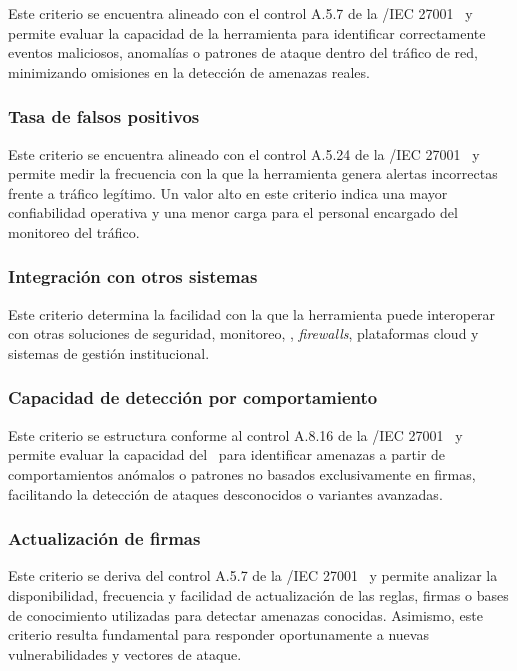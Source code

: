 Este criterio se encuentra alineado con el control A.5.7 de la \ISO/IEC 27001~\cite{iso27001} y permite evaluar la capacidad de la 
herramienta para identificar correctamente eventos maliciosos, anomalías o patrones de ataque dentro del tráfico de red, minimizando 
omisiones en la detección de amenazas reales.

\subsubsection{Tasa de falsos positivos}

Este criterio se encuentra alineado con el control A.5.24 de la \ISO/IEC 27001~\cite{iso27001} y permite medir la frecuencia con la que la 
herramienta genera alertas incorrectas frente a tráfico legítimo. Un valor alto en este criterio indica una mayor confiabilidad operativa y 
una menor carga para el personal encargado del monitoreo del tráfico.

\subsubsection{Integración con otros sistemas}

Este criterio determina la facilidad con la que la herramienta puede interoperar con otras soluciones de seguridad, monitoreo, \SIEM, 
\textit{firewalls}, plataformas cloud y sistemas de gestión institucional.

\subsubsection{Capacidad de detección por comportamiento}

Este criterio se estructura conforme al control A.8.16 de la \ISO/IEC 27001~\cite{iso27001} y permite evaluar la capacidad del \IDPS\ para 
identificar amenazas a partir de comportamientos anómalos o patrones no basados exclusivamente en firmas, facilitando la detección de 
ataques desconocidos o variantes avanzadas.

\subsubsection{Actualización de firmas}

Este criterio se deriva del control A.5.7 de la \ISO/IEC 27001~\cite{iso27001} y permite analizar la disponibilidad, frecuencia y facilidad 
de actualización de las reglas, firmas o bases de conocimiento utilizadas para detectar amenazas conocidas. Asimismo, este criterio 
resulta fundamental para responder oportunamente a nuevas vulnerabilidades y vectores de ataque.

